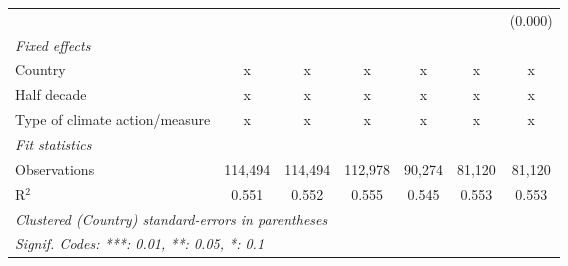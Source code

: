 \begin{tabular}{lcccccc}
                                                            &         &                &               &                &                & (0.000)\\   
   \emph{Fixed effects}\\
   Country                                                  & x       & x              & x             & x              & x              & x\\  
   Half decade                                              & x       & x              & x             & x              & x              & x\\  
   Type of climate action/measure                           & x       & x              & x             & x              & x              & x\\  
   \midrule \emph{Fit statistics}\\
   Observations                                             & 114,494 & 114,494        & 112,978       & 90,274         & 81,120         & 81,120\\  
   R$^2$                                                    & 0.551   & 0.552          & 0.555         & 0.545          & 0.553          & 0.553\\  
   \midrule
   \multicolumn{7}{l}{\emph{Clustered (Country) standard-errors in parentheses}}\\
   \multicolumn{7}{l}{\emph{Signif. Codes: ***: 0.01, **: 0.05, *: 0.1}}\\
\end{tabular}
\par\endgroup


